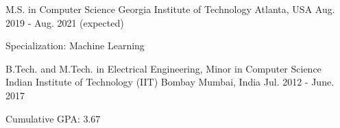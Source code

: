 

\begin{cventries}

\cventry
{M.S. in Computer Science} %
{Georgia Institute of Technology} %
{Atlanta, USA} %
{Aug. 2019 - Aug. 2021 (expected)} %
{
	\begin{cvitems} %
		\item {Specialization: Machine Learning}
	\end{cvitems}
}

  \cventry
    {B.Tech. and M.Tech. in Electrical Engineering, Minor in Computer Science} %
    {Indian Institute of Technology (IIT) Bombay} %
    {Mumbai, India} %
    {Jul. 2012 - June. 2017} %
    {
      \begin{cvitems} %
        \item {Cumulative GPA: 3.67}
      \end{cvitems}
    }

\end{cventries}
